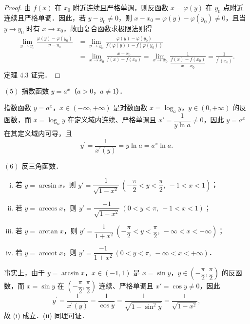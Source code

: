 \begin{proof}
由 $f(x)$ 在 $x_0$ 附近连续且严格单调，则反函数 $x = \varphi(y)$ 在 $y_0$ 点附近连续且严格单调．因此，若 $y - y_0 \neq 0$，则 $x - x_0 = \varphi(y) - \varphi(y_0) \neq 0$，且当 $y \to y_0$ 时有 $x \to x_0$，故由复合函数求极限法则得
\[
\begin{aligned}
\lim_{y\to y_0}\frac{\varphi(y) - \varphi\left(y_0\right)}{y - y_0} &= \lim_{y\to y_0}\frac{\varphi(y) - \varphi\left(y_0\right)}{f(\varphi(y)) - f\left(\varphi\left(y_0\right)\right)}\\
&= \lim_{x\to x_0}\frac{x - x_0}{f(x) - f\left(x_0\right)} = \lim_{x\to x_0}\frac{1}{\dfrac{f(x) - f\left(x_0\right)}{x - x_0}} = \frac{1}{f^{\prime}\left(x_0\right)}.
\end{aligned}
\]
定理 4.3 证完．
\end{proof}

$(5)$ 指数函数 $y = a^x$（$a > 0$，$a \neq 1$）．

指数函数 $y = a^x$，$x \in (-\infty, +\infty)$ 是对数函数 $x = \log_a y$，$y \in (0, +\infty)$ 的反函数，而 $x = \log_a y$ 在定义域内连续、严格单调且 $x' = \dfrac{1}{y\ln a} \neq 0$，因此 $y = a^x$ 在其定义域内可导，且
\[
y^{\prime} = \frac{1}{x^{\prime}\left(y\right)} = y\ln a = a^{x}\ln a.
\]

$(6)$ 反三角函数．

\begin{enumerate}[(i)]
\item 若 $y = \arcsin x$，则 $y' = \dfrac{1}{\sqrt{1 - x^2}}\ \left(-\dfrac{\pi}{2} < y < \dfrac{\pi}{2},\ -1 < x < 1\right)$；
\item 若 $y = \arccos x$，则 $y' = \dfrac{-1}{\sqrt{1 - x^2}}\ \left(0 < y < \pi,\ -1 < x < 1\right)$；
\item 若 $y = \arctan x$，则 $y' = \dfrac{1}{1 + x^2}\ \left(-\dfrac{\pi}{2} < y < \dfrac{\pi}{2},\ -\infty < x < +\infty\right)$；
\item 若 $y = \operatorname{arccot} x$，则 $y' = \dfrac{-1}{1 + x^2}\ \left(0 < y < \pi,\ -\infty < x < +\infty\right)$．
\end{enumerate}

事实上，由于 $y = \arcsin x$，$x \in (-1,1)$ 是 $x = \sin y$，$y \in \left(-\dfrac{\pi}{2}, \dfrac{\pi}{2}\right)$ 的反函数，而 $x = \sin y$ 在 $\left(-\dfrac{\pi}{2}, \dfrac{\pi}{2}\right)$ 连续、严格单调且 $x' = \cos y \neq 0$，因此
\[
y^{\prime} = \frac{1}{x^{\prime}(y)} = \frac{1}{\cos y} = \frac{1}{\sqrt{1 - \sin^{2}y}} = \frac{1}{\sqrt{1 - x^{2}}},
\]
故 (i) 成立．(ii) 同理可证．

